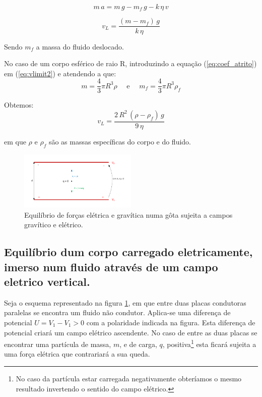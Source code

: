 \documentclass[a4paper,twoside,12pt]{article}      %
\begin{document}
\begin{equation}
	\label{eq:mov2}
	m\,a = m\,g - m_f\,g  - k  \, \eta \, v
\end{equation}


\begin{equation}
	\label{eq:vlimit2}
	v_L = \frac{(m - m_f)\,g}{k  \, \eta}
\end{equation}

Sendo $m_f$ a massa do fluido deslocado.

No caso de um corpo esférico de raio R, introduzindo a equação (\ref{eq:coef_atrito}) em (\ref{eq:vlimit2}) e atendendo a que:
\begin{equation*}
	m = \frac{4}{3} \pi R^3 \rho \quad \textrm{  e } \quad  m_f = \frac{4}{3} \pi R^3 \rho_f
\end{equation*}

Obtemos:
\begin{equation}
	\label{eq:vlimit3}
	v_L = \frac{2\,R^2\, (\rho - \rho_f)\,g}{9  \, \eta}
\end{equation}

em que $\rho$  e $\rho_f$ são as massas específicas do corpo e do fluido.

%


\begin{figure}
	[tb]  \centering 
	\includegraphics[width=0.5\textwidth]{./F_equil}
	\caption{Equilíbrio de forças elétrica e gravítica numa gôta sujeita a campos gravítico e elétrico. \label{fig:f_equil}} 
\end{figure}


\subsection{\sf Equilíbrio dum corpo carregado eletricamente, imerso num fluido através de um campo eletrico vertical.}

Seja o esquema representado na figura \ref{fig:f_equil}, em que entre duas placas condutoras paralelas se encontra um fluido não condutor. Aplica-se uma diferença de potencial $U = V_1 -V_1 > 0$ com a polaridade indicada na figura. Esta diferença de potencial criará um campo elétrico ascendente. No caso de entre as duas placas se encontrar uma partícula de massa, $m$, e de carga, $q$, positiva\footnote{No caso da partícula estar carregada negativamente obteríamos o mesmo resultado invertendo o sentido do campo elétrico.} esta ficará sujeita a uma força elétrica que contrariará a sua queda.
\end{document}
